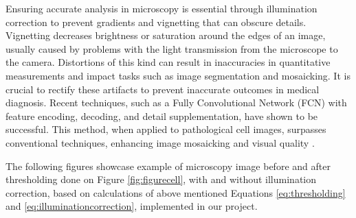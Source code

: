 \documentclass[%
	a4paper, %
	12pt, %
	english, %
	bibtotoc %
]{scrartcl}
\begin{document}
Ensuring accurate analysis in microscopy is essential through illumination correction to prevent gradients and vignetting that can obscure details. Vignetting decreases brightness or saturation around the edges of an image, usually caused by problems with the light transmission from the microscope to the camera. Distortions of this kind can result in inaccuracies in quantitative measurements and impact tasks such as image segmentation and mosaicking. It is crucial to rectify these artifacts to prevent inaccurate outcomes in medical diagnosis. Recent techniques, such as a Fully Convolutional Network (FCN) with feature encoding, decoding, and detail supplementation, have shown to be successful. This method, when applied to pathological cell images, surpasses conventional techniques, enhancing image mosaicking and visual quality \cite{wang_fcn_microscopic_image_illumination_correction}.

The following figures showcase example of microscopy image  before and after thresholding done on Figure \ref{fig:figurecell}, with and without illumination correction, based on calculations of above mentioned Equations \ref{eq:thresholding} and \ref{eq:illuminationcorrection}, implemented in our project.
\end{document}
